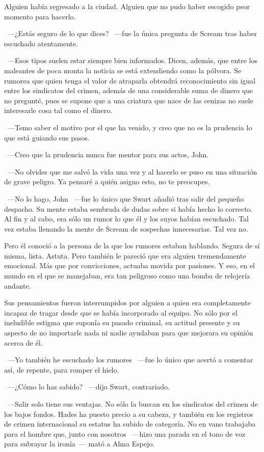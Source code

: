Alguien había regresado a la ciudad. Alguien que no pudo haber escogido peor momento para hacerlo.

~---¿Estás seguro de lo que dices? ~---fue la única pregunta de Scream tras haber escuchado atentamente.

~---Esos tipos suelen estar siempre bien informados. Dicen, además, que entre los maleantes de poca monta la noticia se está extendiendo como la pólvora. Se rumorea que quien tenga el valor de atraparla obtendrá reconocimiento sin igual entre los sindicatos del crimen, además de una considerable suma de dinero que no pregunté, pues se supone que a una criatura que nace de las cenizas no suele interesarle cosa tal como el dinero.

~---Temo saber el motivo por el que ha venido, y creo que no es la prudencia lo que está guiando sus pasos.

~---Creo que la prudencia nunca fue mentor para sus actos, John.

~---No olvides que me salvó la vida una vez y al hacerlo se puso en una situación de grave peligro. Ya pensaré a quién asigno esto, no te preocupes.

~---No lo hago, John ~---fue lo único que Swart añadió tras salir del pequeño despacho. Su mente estaba sembrada de dudas sobre si había hecho lo correcto. Al fin y al cabo, era sólo un rumor lo que él y los suyos habían escuchado. Tal vez estaba llenando la mente de Scream de sospechas innecesarias. Tal vez no.

Pero él conoció a la persona de la que los rumores estaban hablando. Segura de sí misma, lista. Astuta. Pero también le pareció que era alguien tremendamente emocional. Más que por convicciones, actuaba movida por pasiones. Y eso, en el mundo en el que se manejaban, era tan peligroso como una bomba de relojería andante.

Sus pensamientos fueron interrumpidos por alguien a quien era completamente incapaz de tragar desde que se había incorporado al equipo. No sólo por el ineludible estigma que suponía su pasado criminal,  su actitud presente y su aspecto de no importarle nada ni nadie ayudaban para que mejorara su opinión acerca de él.

~---Yo también he escuchado los rumores ~---fue lo único que acertó a comentar así, de repente, para romper el hielo.

~---¿Cómo lo has sabido? ~---dijo Swart, contrariado.

~---Salir solo tiene sus ventajas. No sólo la buscan en los sindicatos del crimen de los bajos fondos. Hades ha puesto precio a su cabeza, y también en los registros de crimen internacional su estatus ha subido de categoría. No en vano trabajaba para el hombre que, junto con nosotros ~---hizo una parada en el tono de voz para subrayar la ironía~--- mató a Alma Espejo.

